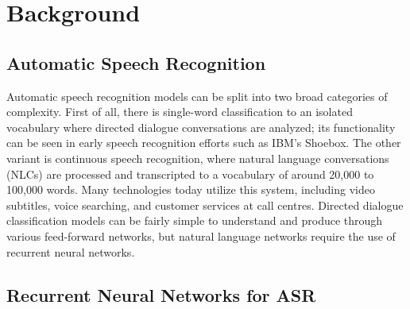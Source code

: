 
\chapter{Background} %

\label{Background} %


\section{Automatic Speech Recognition}

Automatic speech recognition models can be split into two broad categories of complexity. First of all, there is single-word classification to an isolated vocabulary where directed dialogue conversations are analyzed; its functionality can be seen in early speech recognition efforts such as IBM’s Shoebox. The other variant is continuous speech recognition, where natural language conversations (NLCs) are processed and transcripted to a vocabulary of around 20,000 to 100,000 words. Many technologies today utilize this system, including video subtitles, voice searching, and customer services at call centres. Directed dialogue classification models can be fairly simple to understand and produce through various feed-forward networks, but natural language networks require the use of recurrent neural networks.

\section{Recurrent Neural Networks for ASR}

